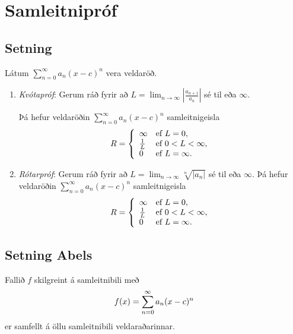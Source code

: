 \documentclass[a4paper,10pt,icelandic]{sphinxmanual}
\begin{document}

\section{Samleitnipróf}
\label{kafli10:samleitniprof}\label{kafli10:index-3}

\subsection{Setning}
\label{kafli10:id2}
Látum \(\sum_{n=0}^\infty a_n(x-c)^n\) vera veldaröð.
\begin{enumerate}
\item {} 
\textit{Kvótapróf}: Gerum ráð fyrir að
\(L=\lim_{n\rightarrow\infty}\left|\frac{a_{n+1}}{a_n}\right|\)
sé til eða \(\infty\).

Þá hefur veldaröðin \(\sum_{n=0}^\infty a_n(x-c)^n\)
samleitnigeisla
\begin{gather}
\begin{split}R= \left\{\begin{array}{ll}
\infty & \mbox{ef }L=0,\\
\frac{1}{L} & \mbox{ef }0<L<\infty,\\
0 & \mbox{ef }L=\infty.\\
\end{array} \right.\end{split}\notag
\end{gather}
\item {} 
\textit{Rótarpróf}: Gerum ráð fyrir að
\(L=\lim_{n\rightarrow\infty}\sqrt[n]{|a_n|}\) sé til eða
\(\infty\). Þá hefur veldaröðin
\(\sum_{n=0}^\infty a_n(x-c)^n\) samleitnigeisla
\begin{gather}
\begin{split}R= \left\{\begin{array}{ll}
\infty & \mbox{ef }L=0,\\
\frac{1}{L} & \mbox{ef }0<L<\infty,\\
0 & \mbox{ef }L=\infty.\\
\end{array}
\right.\end{split}\notag
\end{gather}
\end{enumerate}


\subsection{Setning Abels}
\label{kafli10:setning-abels}\label{kafli10:index-4}
Fallið \(f\) skilgreint á samleitnibili með
\begin{gather}
\begin{split}f(x)=\sum_{n=0}^\infty a_n(x-c)^n\end{split}\notag
\end{gather}
er samfellt á öllu samleitnibili veldaraðarinnar.
\end{document}
